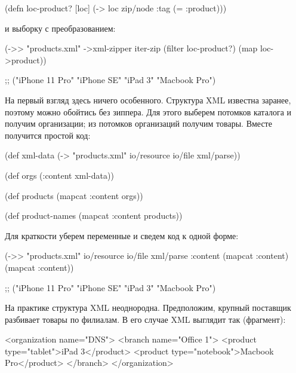 \begin{english}
  \begin{clojure}
(defn loc-product? [loc]
  (-> loc zip/node :tag (= :product)))
  \end{clojure}
\end{english}

\noindent
и выборку с преобразованием:

\begin{english}
  \begin{clojure}
(->> "products.xml"
     ->xml-zipper
     iter-zip
     (filter loc-product?)
     (map loc->product))

;; ("iPhone 11 Pro" "iPhone SE" "iPad 3" "Macbook Pro")
  \end{clojure}
\end{english}

На первый взгляд здесь ничего особенного. Структура XML известна заранее,
поэтому можно обойтись без зиппера. Для этого выберем потомков каталога и
получим организации; из потомков организаций получим товары. Вместе получится
простой код:

\begin{english}
  \begin{clojure}
(def xml-data
  (-> "products.xml"
      io/resource
      io/file
      xml/parse))

(def orgs
  (:content xml-data))

(def products
  (mapcat :content orgs))

(def product-names
  (mapcat :content products))
  \end{clojure}
\end{english}

Для краткости уберем переменные и сведем код к одной форме:

\begin{english}
  \begin{clojure}
(->> "products.xml"
     io/resource
     io/file
     xml/parse
     :content
     (mapcat :content)
     (mapcat :content))

;; ("iPhone 11 Pro" "iPhone SE" "iPad 3" "Macbook Pro")
  \end{clojure}
\end{english}

На практике структура XML неоднородна. Предположим, крупный поставщик разбивает
товары по филиалам. В его случае XML выглядит так (фрагмент):

\begin{english}
  \begin{xml}
<organization name="DNS">
  <branch name="Office 1">
    <product type="tablet">iPad 3</product>
    <product type="notebook">Macbook Pro</product>
  </branch>
</organization>
  \end{xml}
\end{english}

